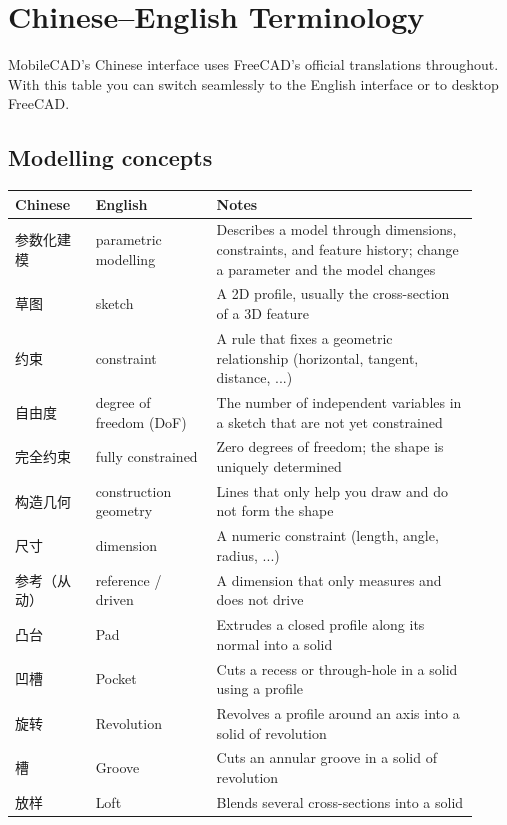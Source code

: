 \chapter{Chinese--English Terminology}

MobileCAD's Chinese interface uses FreeCAD's official translations throughout. With this table you can switch
seamlessly to the English interface or to desktop FreeCAD.

\section{Modelling concepts}

\begin{longtable}{@{}p{0.16\linewidth}p{0.24\linewidth}p{0.52\linewidth}@{}}
\toprule \textbf{Chinese} & \textbf{English} & \textbf{Notes} \\ \midrule \endhead
参数化建模 & parametric modelling & Describes a model through dimensions, constraints, and feature history; change a parameter and the model changes \\
草图 & sketch & A 2D profile, usually the cross-section of a 3D feature \\
约束 & constraint & A rule that fixes a geometric relationship (horizontal, tangent, distance, ...) \\
自由度 & degree of freedom (DoF) & The number of independent variables in a sketch that are not yet constrained \\
完全约束 & fully constrained & Zero degrees of freedom; the shape is uniquely determined \\
构造几何 & construction geometry & Lines that only help you draw and do not form the shape \\
尺寸 & dimension & A numeric constraint (length, angle, radius, ...) \\
参考（从动） & reference / driven & A dimension that only measures and does not drive \\
凸台 & Pad & Extrudes a closed profile along its normal into a solid \\
凹槽 & Pocket & Cuts a recess or through-hole in a solid using a profile \\
旋转 & Revolution & Revolves a profile around an axis into a solid of revolution \\
槽 & Groove & Cuts an annular groove in a solid of revolution \\
放样 & Loft & Blends several cross-sections into a solid \\

\end{longtable}
